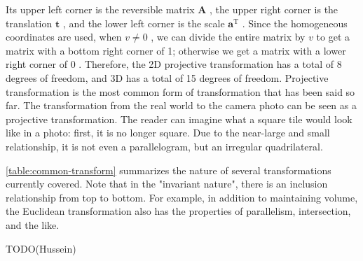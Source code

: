 \begin{enumerate}
	Its upper left corner is the reversible matrix $ \bm{A} $ , the upper right corner is the translation $ \bm{t} $ , and the lower left corner is the scale $ \bm{a}^ \mathrm {T} $ . Since the homogeneous coordinates are used, when $ v \neq  0 $ , we can divide the entire matrix by $ v $ to get a matrix with a bottom right corner of 1; otherwise we get a matrix with a lower right corner of $ 0 $ . Therefore, the 2D projective transformation has a total of 8 degrees of freedom, and 3D has a total of 15 degrees of freedom. Projective transformation is the most common form of transformation that has been said so far. The transformation from the real world to the camera photo can be seen as a projective transformation. The reader can imagine what a square tile would look like in a photo: first, it is no longer square. Due to the near-large and small relationship, it is not even a parallelogram, but an irregular quadrilateral.
\end{enumerate}

\autoref{table:common-transform} summarizes the nature of several transformations currently covered. Note that in the "invariant nature", there is an inclusion relationship from top to bottom. For example, in addition to maintaining volume, the Euclidean transformation also has the properties of parallelism, intersection, and the like.

TODO(Hussein)

